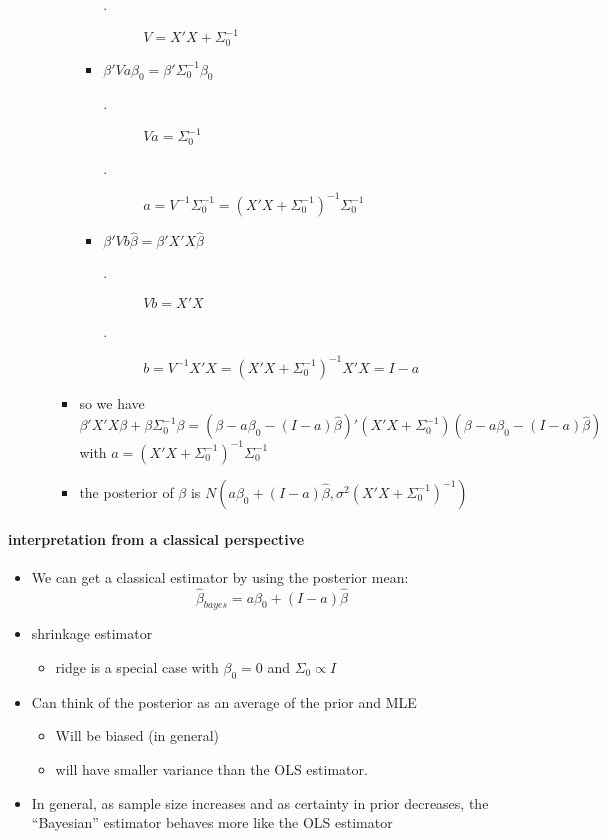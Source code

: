 \begin{itemize}
\begin{itemize}
\begin{itemize}
\begin{itemize}
\begin{description}
\item[.] $V = X'X + \Sigma_0^{-1}$
\end{description}
\item $\beta'V a \beta_0 = \beta'\Sigma_0^{-1}\beta_0$
\begin{description}
\item[.] $V a = \Sigma_0^{-1}$
\item[.] $a = V^{-1} \Sigma_0^{-1} = (X'X + \Sigma_0^{-1})^{-1} \Sigma_0^{-1}$
\end{description}
\item $\beta'V b \hat\beta = \beta'X'X \hat\beta$
\begin{description}
\item[.] $V b = X'X$
\item[.] $b = V^{-1} X'X = (X'X + \Sigma_0^{-1})^{-1} X'X = I -
                a$
\end{description}
\end{itemize}
\item so we have 
            \[\beta'X'X\beta + \beta \Sigma_0^{-1} \beta = (\beta - a
            \beta_0 - (I - a) \hat\beta)'(X'X + \Sigma_0^{-1}) (\beta - a
            \beta_0 - (I - a) \hat\beta)\]
            with $a = (X'X + \Sigma_0^{-1})^{-1}\Sigma_0^{-1}$
\item the posterior of $\beta$ is $N(a \beta_0 + (I - a)\hat\beta,
            \sigma^2 (X'X + \Sigma_0^{-1})^{-1})$
\end{itemize}
\end{itemize}
\end{itemize}

\paragraph{interpretation from a classical perspective}
\begin{itemize}
\item We can get a classical estimator by using the posterior mean:
        \[ \hat{\beta}_{bayes} = a \beta_{0} + (I - a)\hat{\beta} \]
\item shrinkage estimator
\begin{itemize}
\item ridge is a special case with $\beta_0 = 0$ and $\Sigma_0 \propto I$
\end{itemize}
\item Can think of the posterior as an average of the prior and MLE
\begin{itemize}
\item Will be biased (in general)
\item will have smaller variance than the OLS estimator.
\end{itemize}
\item In general, as sample size increases and as certainty in
        prior decreases, the ``Bayesian'' estimator behaves more like the
        OLS estimator
\end{itemize}

